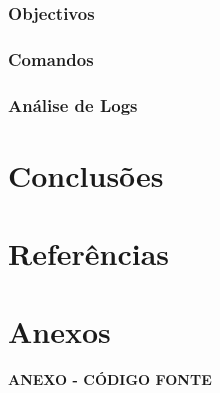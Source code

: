 \documentclass[a4paper,11pt]{article}
\begin{document}
\subsubsection{Objectivos}

\subsubsection{Comandos}

\subsubsection{Análise de Logs}

\section{Conclusões}

\section{Referências}

\section{Anexos}


\newpage

\vspace*{\fill} 
\centering
\begin{Huge}\textbf{ANEXO - CÓDIGO FONTE}\end{Huge}
\vspace*{\fill}
\thispagestyle{empty}
\setcounter{page}{1}
\end{document}
